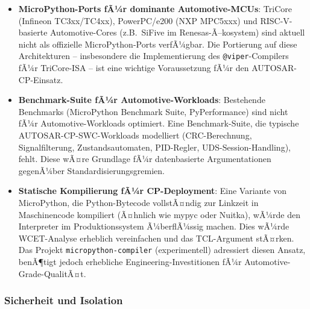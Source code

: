 ﻿\documentclass[12pt,a4paper,twoside]{article}
\begin{document}
\begin{itemize}
  \item \textbf{MicroPython-Ports fÃ¼r dominante Automotive-MCUs}:
        TriCore (Infineon TC3xx/TC4xx), PowerPC/e200 (NXP MPC5xxx)
        und RISC-V-basierte Automotive-Cores (z.B.\ SiFive im
        Renesas-Ã–kosystem) sind aktuell nicht als offizielle MicroPython-Ports
        verfÃ¼gbar.
        Die Portierung auf diese Architekturen -- insbesondere die
        Implementierung des \texttt{@viper}-Compilers fÃ¼r TriCore-ISA --
        ist eine wichtige Voraussetzung fÃ¼r den AUTOSAR-CP-Einsatz.

  \item \textbf{Benchmark-Suite fÃ¼r Automotive-Workloads}:
        Bestehende Benchmarks (MicroPython Benchmark Suite, PyPerformance)
        sind nicht fÃ¼r Automotive-Workloads optimiert.
        Eine Benchmark-Suite, die typische AUTOSAR-CP-SWC-Workloads modelliert
        (CRC-Berechnung, Signalfilterung, Zustandsautomaten, PID-Regler,
        UDS-Session-Handling), fehlt.
        Diese wÃ¤re Grundlage fÃ¼r datenbasierte Argumentationen
        gegenÃ¼ber Standardisierungsgremien.

  \item \textbf{Statische Kompilierung fÃ¼r CP-Deployment}:
        Eine Variante von MicroPython, die Python-Bytecode vollstÃ¤ndig
        zur Linkzeit in Maschinencode kompiliert (Ã¤hnlich wie mypyc oder Nuitka),
        wÃ¼rde den Interpreter im Produktionssystem Ã¼berflÃ¼ssig machen.
        Dies wÃ¼rde WCET-Analyse erheblich vereinfachen und das TCL-Argument stÃ¤rken.
        Das Projekt \texttt{micropython-compiler} (experimentell) adressiert
        diesen Ansatz, benÃ¶tigt jedoch erhebliche Engineering-Investitionen
        fÃ¼r Automotive-Grade-QualitÃ¤t.
\end{itemize}

\subsubsection{Sicherheit und Isolation}
\end{document}
